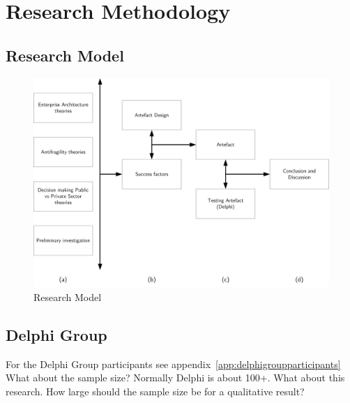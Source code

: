 \chapter{Research Methodology}
\label{ch:research-methodology}

\section{Research Model}
\label{sec:research-model}
	\begin{figure}[h]
		\centering
		\includegraphics[width=12cm]{images/research-model.png}
		\caption[Research Model]{Research Model}
		\label{fig:research-model}
	\end{figure}

\section{Delphi Group}
For the Delphi Group participants see appendix~\ref{app:delphigroupparticipants} \\%

What about the sample size? Normally Delphi is about 100+. What about this research. How large should the sample size be for a qualitative result?

